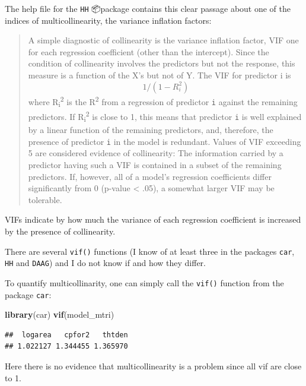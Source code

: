 \documentclass[
  12pt,
]{book}
\makeatletter
\newenvironment{Shaded}{\begin{snugshade}}{\end{snugshade}}
\newcommand{\KeywordTok}[1]{\textcolor[rgb]{0.13,0.29,0.53}{\textbf{#1}}}
\newcommand{\NormalTok}[1]{#1}
\newenvironment{kframe}{%
\medskip{}
\setlength{\fboxsep}{.8em}
\def\at@end@of@kframe{}%
\ifinner\ifhmode%
 \def\at@end@of@kframe{\end{minipage}}%
 \begin{minipage}{\columnwidth}%
\fi\fi%
\def\FrameCommand##1{\hskip\@totalleftmargin \hskip-\fboxsep
\colorbox{incolor}{##1}\hskip-\fboxsep
    \hskip-\linewidth \hskip-\@totalleftmargin \hskip\columnwidth}%
\MakeFramed {\advance\hsize-\width
  \@totalleftmargin\z@ \linewidth\hsize
  \@setminipage}}%
{\par\unskip\endMakeFramed%
\at@end@of@kframe}
\newenvironment{rmdblock}[1]
 {
 \begin{itemize}
 \renewcommand{\labelitemi}{
   \raisebox{-.7\height}[0pt][0pt]{
     {\setkeys{Gin}{width=3em,keepaspectratio}\texttt{[image: images/\#1]}}
   }
 }
 \begin{kframe}
 \setlength{\fboxsep}{1em}
 \item
 }
 {
 \end{kframe}
 \end{itemize}
 }
\newenvironment{rmdtip}
  {\begin{rmdblock}{tip}}
  {\end{rmdblock}}
\makeatother
\begin{document}
The help file for the \texttt{HH} 📦package contains this clear passage about one of the indices of multicollinearity, the variance inflation factors:

\begin{quote}
A simple diagnostic of collinearity is the variance inflation factor, VIF one for each regression coefficient (other than the intercept). Since the condition of collinearity involves the predictors but not the response, this measure is a function of the X's but not of Y. The VIF for predictor i is
\[1/(1-R_i^2)\]
where R\textsubscript{i}\textsuperscript{2} is the R\textsuperscript{2} from a regression of predictor \texttt{i} against the remaining predictors. If R\textsubscript{i}\textsuperscript{2} is close to 1, this means that predictor \texttt{i} is well explained by a linear function of the remaining predictors, and, therefore, the presence of predictor \texttt{i} in the model is redundant. Values of VIF exceeding 5 are considered evidence of collinearity: The information carried by a predictor having such a VIF is contained in a subset of the remaining predictors. If, however, all of a model's regression coefficients differ significantly from 0 (p-value \textless{} .05), a somewhat larger VIF may be tolerable.
\end{quote}

VIFs indicate by how much the variance of each regression coefficient is increased by the presence of collinearity.

\begin{rmdtip}
There are several \texttt{vif()} functions (I know of at least three in the packages \texttt{car}, \texttt{HH} and \texttt{DAAG}) and I do not know if and how they differ.
\end{rmdtip}

To quantify multicollinarity, one can simply call the \texttt{vif()} function
from the package \texttt{car}:

\begin{Shaded}
\begin{Highlighting}[]
\KeywordTok{library}\NormalTok{(car)}
\KeywordTok{vif}\NormalTok{(model\_mtri)}
\end{Highlighting}
\end{Shaded}

\begin{verbatim}
##  logarea   cpfor2   thtden 
## 1.022127 1.344455 1.365970
\end{verbatim}

Here there is no evidence that multicollinearity is a problem since all vif are close to 1.
\end{document}
